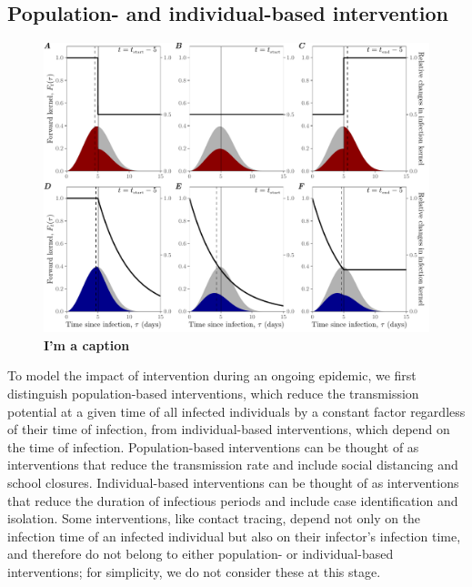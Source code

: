 \documentclass[12pt]{article}
\begin{document}
\subsection{Population- and individual-based intervention}

\begin{figure}[!th]
\includegraphics[width=1\textwidth]{pop_ind_compare.pdf}
\caption{
\textbf{I'm a caption}
}
\label{fig:indpop}
\end{figure}

To model the impact of intervention during an ongoing epidemic, we first distinguish population-based interventions, which reduce the transmission potential at a given time of all infected individuals by a constant factor regardless of their time of infection, from individual-based interventions, which depend on the time of infection.
Population-based interventions can be thought of as interventions that reduce the transmission rate and include social distancing and school closures.
Individual-based interventions can be thought of as interventions that reduce the duration of infectious periods and include case identification and isolation.
Some interventions, like contact tracing, depend not only on the infection time of an infected individual but also on their infector's infection time, and therefore do not belong to either population- or individual-based interventions;
for simplicity, we do not consider these at this stage.
\end{document}
